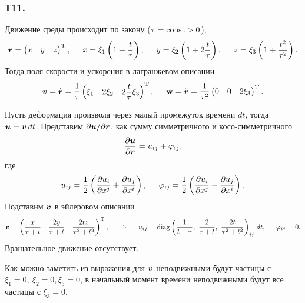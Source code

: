 \subsubsection*{Т11.}

Движение среды происходит по закону ($\tau = \text{const} > 0$),
$$
    \mbox{\boldmath $r$} = \begin{pmatrix}
        x & y & z
    \end{pmatrix}^{\text{T}}, \hspace{0.5cm} 
    x = \xi_1 \left(1 +   \frac{t}{\tau} \right), \hspace{0.5cm} 
    y = \xi_2 \left(1 + 2 \frac{t}{\tau} \right), \hspace{0.5cm} 
    z = \xi_3 \left(1 +\frac{t^2}{\tau^2}\right).
$$
Тогда поля скорости и ускорения в лагранжевом описании
$$
    \mbox{\boldmath $v$} = \dot{\mbox{\boldmath $r$}} =
    \frac{1}{\tau} 
    \begin{pmatrix}
        \xi_1 & 2 \xi_2 & 2 \dfrac{t}{\tau} \xi_3      
    \end{pmatrix}^{\text{T}},
    \hspace{0.5cm} 
    \mbox{\boldmath $\mathrm{w}$} = \ddot{\mbox{\boldmath $r$}} = \dfrac{1}{\tau^2} \begin{pmatrix}
        0 & 0 & 2 \xi_3
    \end{pmatrix}^{\text{T}}.
$$

Пусть деформация произвола через малый промежуток времени $dt$, тогда $\mbox{\boldmath $u$} = \mbox{\boldmath $v$} \, d t$. Представим $\partial \mbox{\boldmath $u$} / \partial \mbox{\boldmath $r$}$, как сумму симметричного и косо-симметричного
$$
    \frac{\partial \mbox{\boldmath $u$}}{\partial \mbox{\boldmath $r$}} = u_{ij} + \varphi_{ij},
$$
где
$$
    u_{ij} = \frac{1}{2} \left(
    \frac{\partial u_i}{\partial x^j} + \frac{\partial u_j}{\partial x^i} 
    \right),
    \hspace{0.5cm} 
    \varphi_{ij} = \frac{1}{2} \left(
        \frac{\partial u_i}{\partial x^j} - \frac{\partial u_j}{\partial x^i} 
    \right).
$$
Подставим $\mbox{\boldmath $v$}$ в эйлеровом описании
$$
    \mbox{\boldmath $v$} = \begin{pmatrix}
        \dfrac{x}{\tau+t} &
        \dfrac{2y}{\tau+t} &
        \dfrac{2tz}{\tau^2+t^2} 
    \end{pmatrix}^{\text{T}},
    \hspace{0.5cm} \Rightarrow \hspace{0.5cm} 
    u_{ij} =
    \mathop{\mathrm{diag}}\nolimits\left(
        \frac{1}{t+\tau}, \ \frac{2}{\tau+t}, \ \frac{2t}{\tau^2+t^2} 
    \right)_{ij}\, d t,
    \hspace{0.5cm} 
    \varphi_{ij} = 0.
$$
Вращательное движение отсутствует.


Как можно заметить из выражения для $\mbox{\boldmath $v$}$ неподвижными будут частицы с $\xi_1 = 0, \ \xi_2 = 0, \xi_3 = 0$, в начальный момент времени неподвижными будут все частицы с $\xi_3 = 0$.
